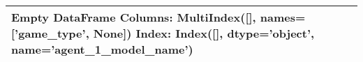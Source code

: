 \begin{tabular}{l}
\toprule
Empty DataFrame
Columns: MultiIndex([], names=['game_type', None])
Index: Index([], dtype='object', name='agent_1_model_name') \\
\bottomrule
\end{tabular}
